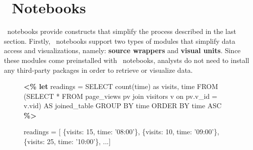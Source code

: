  

\section{\projname\ Notebooks}

\projname\ notebooks provide constructs that simplify the process described in the last section. Firstly, \projname\ notebooks support two types of modules that simplify data access and visualizations, namely: \textbf{source wrappers} and \textbf{visual units}. Since these modules come preinstalled with \projname\ notebooks, analysts do not need to install any third-party packages in order to retrieve or visualize data.

\begin{figure}
\centering
%
%
\begin{minipage}[c]{6cm}
%
\begin{minipage}[c]{6cm}
\begin{code}
\textbf{<\% let} readings = 
   SELECT count(time) as visits, time
   FROM (SELECT * FROM page_views pv 
  	     join visitors v 
         on pv.v_id = v.vid) AS joined_table
   GROUP BY time 
   ORDER BY time ASC \textbf{\%>}
\end{code}
\vspace*{-0.4cm}
\label{figure:first-running-example:data-retrieval}
\vspace*{0.3cm}
\end{minipage}



\begin{minipage}[c]{6cm}
\begin{code}
readings = [
   \{visits: 15, time: '08:00'\}, 
   \{visits: 10, time: '09:00'\},
   \{visits: 25, time: '10:00'\},  ...]
\end{code}
\vspace*{-0.4cm}
\label{figure:running-example:query-result}
\vspace*{0.3cm}
\end{minipage}



\end{minipage}
\end{figure}
